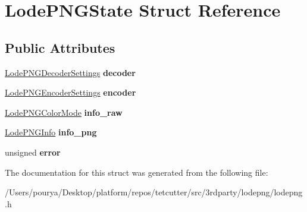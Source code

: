 \hypertarget{structLodePNGState}{}\section{Lode\+P\+N\+G\+State Struct Reference}
\label{structLodePNGState}
\subsection*{Public Attributes}
\begin{DoxyCompactItemize}
\item 
\hypertarget{structLodePNGState_abd2c38ffc68f04b0e4159e1f97ba1f76}{}\hyperlink{structLodePNGDecoderSettings}{Lode\+P\+N\+G\+Decoder\+Settings} {\bfseries decoder}\label{structLodePNGState_abd2c38ffc68f04b0e4159e1f97ba1f76}

\item 
\hypertarget{structLodePNGState_ac63d91db835129d02eb83bbe81de347e}{}\hyperlink{structLodePNGEncoderSettings}{Lode\+P\+N\+G\+Encoder\+Settings} {\bfseries encoder}\label{structLodePNGState_ac63d91db835129d02eb83bbe81de347e}

\item 
\hypertarget{structLodePNGState_a597bc08de787147474d43adf8b6ceacf}{}\hyperlink{structLodePNGColorMode}{Lode\+P\+N\+G\+Color\+Mode} {\bfseries info\+\_\+raw}\label{structLodePNGState_a597bc08de787147474d43adf8b6ceacf}

\item 
\hypertarget{structLodePNGState_a08d9ac43c995fcf34d72b1d37047b6fa}{}\hyperlink{structLodePNGInfo}{Lode\+P\+N\+G\+Info} {\bfseries info\+\_\+png}\label{structLodePNGState_a08d9ac43c995fcf34d72b1d37047b6fa}

\item 
\hypertarget{structLodePNGState_a1a00a050da588cf3c2b7a6252bebb0cd}{}unsigned {\bfseries error}\label{structLodePNGState_a1a00a050da588cf3c2b7a6252bebb0cd}

\end{DoxyCompactItemize}


The documentation for this struct was generated from the following file\+:\begin{DoxyCompactItemize}
\item 
/\+Users/pourya/\+Desktop/platform/repos/tetcutter/src/3rdparty/lodepng/lodepng.\+h\end{DoxyCompactItemize}
